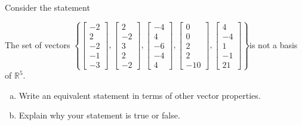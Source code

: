 
\begin{exerciseStatement}


Consider the statement 
\begin{center}\begin{minipage}{0.8\textwidth}
 The set of vectors \( \left\{ \left[\begin{array}{c}
-2 \\
2 \\
-2 \\
-1 \\
-3
\end{array}\right] , \left[\begin{array}{c}
2 \\
-2 \\
3 \\
2 \\
-2
\end{array}\right] , \left[\begin{array}{c}
-4 \\
4 \\
-6 \\
-4 \\
4
\end{array}\right] , \left[\begin{array}{c}
0 \\
0 \\
2 \\
2 \\
-10
\end{array}\right] , \left[\begin{array}{c}
4 \\
-4 \\
1 \\
-1 \\
21
\end{array}\right] \right\} \)is not a basis of \(\mathbb{R}^5\). 
\end{minipage}\end{center}
    


\begin{enumerate}[(a)]
\item  Write an equivalent statement in terms of other vector properties.
\item  Explain why your statement is true or false.
\end{enumerate}
    
\end{exerciseStatement}
    
